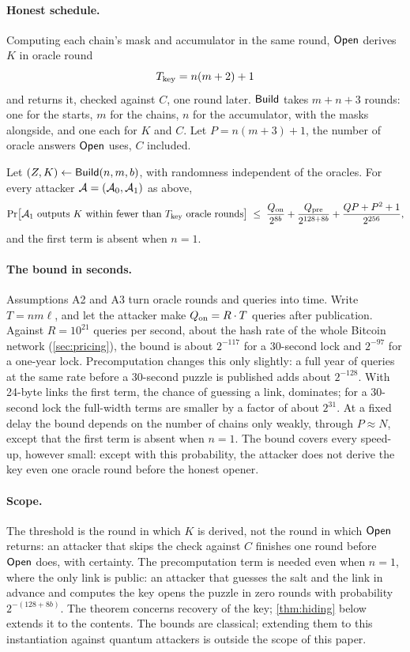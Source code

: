 \paragraph{Honest schedule.}
Computing each chain's mask and accumulator in the same round, $\mathsf{Open}$ derives $K$ in oracle round
\[
  T_{\mathrm{key}} = n(m + 2) + 1
\]
and returns it, checked against $C$, one round later. $\mathsf{Build}$ takes $m + n + 3$ rounds: one for the starts, $m$ for the chains, $n$ for the accumulator, with the masks alongside, and one each for $K$ and $C$. Let $P = n(m + 3) + 1$, the number of oracle answers $\mathsf{Open}$ uses, $C$ included.

\begin{theorem}\label{thm:delay}
Let $(Z, K) \gets \mathsf{Build}(n, m, b)$, with randomness independent of the oracles. For every attacker $\mathcal{A} = (\mathcal{A}_0, \mathcal{A}_1)$ as above,
\[
  \Pr\bigl[\mathcal{A}_1 \text{ outputs } K \text{ within fewer than } T_{\mathrm{key}} \text{ oracle rounds}\bigr]
  \;\le\; \frac{Q_{\mathrm{on}}}{2^{8b}} + \frac{Q_{\mathrm{pre}}}{2^{128 + 8b}} + \frac{QP + P^2 + 1}{2^{256}},
\]
and the first term is absent when $n = 1$.
\end{theorem}

\paragraph{The bound in seconds.}
Assumptions A2 and A3 turn oracle rounds and queries into time. Write $T = n m \ell$, and let the attacker make $Q_{\mathrm{on}} = R \cdot T$ queries after publication. Against $R = 10^{21}$ queries per second, about the hash rate of the whole Bitcoin network (\cref{sec:pricing}), the bound is about $2^{-117}$ for a 30-second lock and $2^{-97}$ for a one-year lock. Precomputation changes this only slightly: a full year of queries at the same rate before a 30-second puzzle is published adds about $2^{-128}$. With 24-byte links the first term, the chance of guessing a link, dominates; for a 30-second lock the full-width terms are smaller by a factor of about $2^{31}$. At a fixed delay the bound depends on the number of chains only weakly, through $P \approx N$, except that the first term is absent when $n = 1$. The bound covers every speed-up, however small: except with this probability, the attacker does not derive the key even one oracle round before the honest opener.

\paragraph{Scope.}
The threshold is the round in which $K$ is derived, not the round in which $\mathsf{Open}$ returns: an attacker that skips the check against $C$ finishes one round before $\mathsf{Open}$ does, with certainty. The precomputation term is needed even when $n = 1$, where the only link is public: an attacker that guesses the salt and the link in advance and computes the key opens the puzzle in zero rounds with probability $2^{-(128 + 8b)}$. The theorem concerns recovery of the key; \cref{thm:hiding} below extends it to the contents. The bounds are classical; extending them to this instantiation against quantum attackers is outside the scope of this paper.


